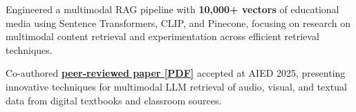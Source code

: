 \documentclass[letterpaper,11pt]{article}
\newcommand{\resumeItem}[1]{
  \item{\small{#1}}
  \vspace{-1.5px}
}
\begin{document}




\resumeItem{Engineered a multimodal RAG pipeline with \textbf{10,000+ vectors} of educational media using Sentence Transformers, CLIP, and Pinecone, focusing on  research on multimodal content retrieval and experimentation across efficient retrieval techniques.}



\resumeItem{Co-authored \href{https://intextbooks.science.uu.nl/workshop2025/files/iTextbooks2025_paper_3.pdf}{\textbf{peer-reviewed paper [PDF]}} accepted at AIED 2025, presenting innovative techniques for multimodal LLM retrieval of audio, visual, and textual data from digital textbooks and classroom sources.}



\end{document}
